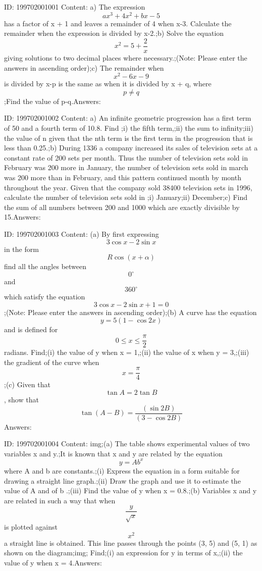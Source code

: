 \documentclass{article}
\begin{document}
ID: 199702001001
Content:
a) The expression \[ax^3+4x^2+bx-5\] has a factor of x + 1 and leaves a remainder of 4 when x-3. Calculate the remainder when the expression is divided by x-2.;b) Solve the equation \[x^2=5+\frac{2}{x}\]  giving solutions to two decimal places where necessary.;(Note: Please enter the answers in ascending order);c) The remainder when \[x^2-6x-9\] is divided by x-p is the same as when it is divided by x + q, where \[p\neq q\];Find the value of p-q.Answers:

ID: 199702001002
Content:
a) An infinite geometric progression has a first term of 50 and a fourth term of 10.8. Find ;i) the fifth term,;ii) the sum to infinity;iii) the value of n given that the nth term is the first term in the progression that is less than 0.25.;b) During 1336 a company increased its sales of television sets at a constant rate of 200 sets per month. Thus the number of television sets sold in February was 200 more in January, the number of television sets sold in march was 200 more than in February, and this pattern continued month by month throughout the year. Given that the company sold 38400 television sets in 1996, calculate the number of television sets sold in ;i) January;ii) December;c) Find the sum of all numbers between 200 and 1000 which are exactly divisible by 15.Answers:

ID: 199702001003
Content:
(a)	By first expressing \[3 \cos x-2 \sin x\] in the form \[R\cos(x+\alpha)\] find all the angles between \[0^{\circ}\] and \[360^{\circ}\] which satisfy the equation \[3 \cos x-2 \sin x + 1 = 0\];(Note: Please enter the answers in ascending order);(b)	A curve has the equation \[y = 5(1- \cos 2x)\] and is defined for \[0\leq x\leq \frac{\pi}{2}\] radians. Find;(i)	the value of y when x = 1,;(ii)	the value of x when y = 3,;(iii)	the gradient of the curve when \[x=\frac{\pi }{4}\];(c) Given that \[\tan A = 2 \tan B\], show that \[\tan(A-B)=\frac{(\sin 2B)}{(3-\cos 2B)}\]Answers:

ID: 199702001004
Content:
img;(a)	The table shows experimental values of two variables x and y.;It is known that x and y are related by the equation \[y=Ab^x\] where A and b are constants.;(i)	Express the equation in a form suitable for drawing a straight line graph.;(ii)	Draw the graph and use it to estimate the value of A and of b .;(iii)	Find the value of y when x = 0.8.;(b)	Variables x and y are related in such a way that when \[\frac{y}{\sqrt{x}}\] is plotted against \[x^{2}\] a straight line is obtained. This line passes through the points (3, 5) and (5, 1) as shown on the diagram;img; Find;(i)	an expression for y in terms of x,;(ii)	the value of y when x = 4.Answers:
\end{document}
